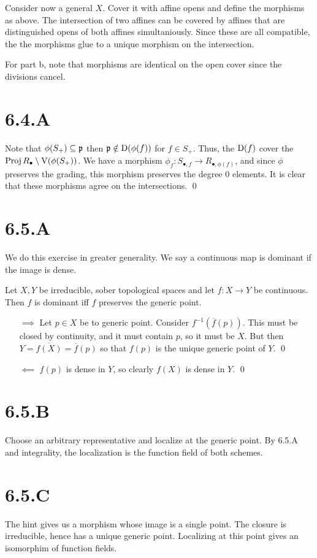 \documentclass{article}
\begin{document}
Consider now a general $X$. Cover it with affine opens and define the morphisms as above. The intersection of two affines can be covered by affines that are distinguished opens of both affines simultaniously. Since these are all compatible, the the morphisms glue to a unique morphism on the intersection.

For part b, note that morphisms are identical on the open cover since the divisions cancel.

\section{6.4.A}
Note that $\phi(S_+) \subseteq \mathfrak{p}$ then $\mathfrak{p} \notin \operatorname{D}(\phi(f))$ for $f \in S_+$. Thus, the $\operatorname{D}(f)$ cover the $\operatorname{Proj} R_{\bullet} \setminus \operatorname{V}(\phi(S_+))$. We have a morphism $\phi_f : S_{\bullet, f} \to R_{\bullet, \phi(f)}$, and since $\phi$ preserves the grading, this morphism preserves the degree 0 elements. It is clear that these morphisms agree on the intersections. \qed

\section{6.5.A}
We do this exercise in greater generality. We say a continuous map is dominant if the image is dense.

Let $X, Y$ be irreducible, sober topological spaces and let $f: X \to Y$ be continuous. Then $f$ is dominant iff $f$ preserves the generic point.

\begin{itemize}
    \item[$\implies$] Let $p\in X$ be to generic point. Consider $f^{-1}(\overline{f}(p))$. This must be closed by continuity, and it must contain $p$, so it must be $X$. But then $Y = \overline{f(X)} = \overline{f}(p)$ so that $f(p)$ is the unique generic point of $Y$. \qed
    \item[$\impliedby$] $f(p)$ is dense in $Y$, so clearly $f(X)$ is dense in $Y$. \qed
\end{itemize}

\section{6.5.B}
Choose an arbitrary representative and localize at the generic point. By 6.5.A and integrality, the localization is the function field of both schemes.

\section{6.5.C}
The hint gives us a morphism whose image is a single point. The closure is irreducible, hence has a unique generic point. Localizing at this point gives an isomorphim of function fields.
\end{document}
